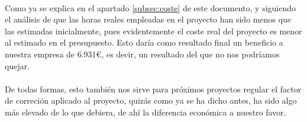 \paragraph{}Como ya se explica en el apartado \ref{subsec:coste} de este documento, y siguiendo el análisis de que las horas reales empleadas en el proyecto han sido menos que las estimadas inicialmente, pues evidentemente el coste real del proyecto es menor al estimado en el presupuesto. Esto daría como resultado final un beneficio a nuestra empresa de 6.931\euro, es decir, un resultado del que no nos podríamos quejar.

\paragraph{} De todas formas, esto también nos sirve para próximos proyectos regular el factor de correción aplicado al proyecto, quizás como ya se ha dicho antes, ha sido algo más elevado de lo que debiera, de ahí la diferencia económica a nuestro favor.